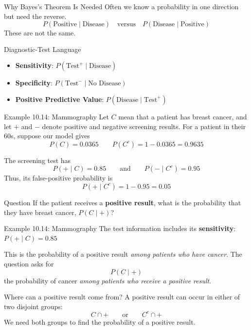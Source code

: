 \documentclass[aspectratio=169]{beamer}
\begin{document}
\begin{frame}{Why Bayes's Theorem Is Needed}
  Often we know a probability in one direction but need the reverse.
  \[
    P(\text{Positive}\mid\text{Disease})
    \quad\text{versus}\quad
    P(\text{Disease}\mid\text{Positive})
  \]
  These are not the same.
  \vspace{0.2cm}
  \begin{block}{Diagnostic-Test Language}
    \begin{itemize}
      \item \textbf{Sensitivity}: $P(\text{Test}^+\mid\text{Disease})$
      \item \textbf{Specificity}: $P(\text{Test}^-\mid\text{No Disease})$
      \item \textbf{Positive Predictive Value}: $P(\text{Disease}\mid\text{Test}^+)$
    \end{itemize}
  \end{block}
\end{frame}

\begin{frame}{Example 10.14: Mammography}
Let $C$ mean that a patient has breast cancer, and let $+$ and $-$ denote positive and negative screening results. For a patient in their 60s, suppose our model gives
$$P(C)=0.0365 \qquad P(C^c)=1-0.0365=0.9635$$

The screening test has
$$P(+\mid C)=0.85 \qquad\text{and}\qquad P(-\mid C^c)=0.95$$
Thus, its false-positive probability is
$$P(+\mid C^c)=1-0.95=0.05$$

\begin{block}{Question}
If the patient receives a \textbf{positive result}, what is the probability that they have breast cancer, $P(C\mid +)$?
\end{block}
\end{frame}

\begin{frame}{Example 10.14: Mammography}
The test information includes its \textbf{sensitivity}: $P(+\mid C)=0.85$

This is the probability of a positive result \emph{among patients who have cancer}. The question asks for
$$P(C\mid +)$$
the probability of cancer \emph{among patients who receive a positive result}.

\begin{block}{Where can a positive result come from?}
A positive result can occur in either of two disjoint groups:
$$C\cap + \qquad\text{or}\qquad C^c\cap +$$
We need both groups to find the probability of a positive result.
\end{block}
\end{frame}
\end{document}
